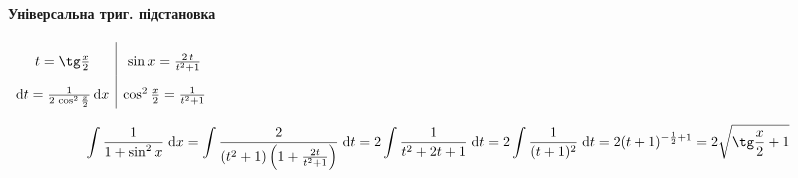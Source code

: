 \documentclass[../rgr1.tex]{subfiles}
\begin{document}
\Solution

\paragraph{Універсальна триг. підстановка}
\begin{varwidth}{1in}
	\fbox
{
	$\def\arraystretch{2}\begin{array}{c|c}t=\tg\frac{x}{2}&\sin x=\frac{2\,t}{{t}^{2}+1}\\\mathrm{d}t=\frac{1}{2\,\cos^{2}\frac{x}{2}}\,\mathrm{d}x&\cos^{2}\frac{x}{2}=\frac{1}{{t}^{2}+1}\end{array}$
}
\end{varwidth}

\begin{dmath}
	\int{\frac{1}{1+\sin^{2}x}}{\;\mathrm{d}x}
	=\int{\frac{2}{(t^2+1)\left(1+\frac{2t}{t^2+1}\right)}}{\;\mathrm{d}t}
	=2\int{\frac{1}{t^2+2t+1}}{\;\mathrm{d}t}
	=2\int{\frac{1}{(t+1)^2}}{\;\mathrm{d}t}
	=2(t+1)^{-\frac{1}{2}+1}
	=2\sqrt{\tg\frac{x}{2}+1}
\end{dmath}

\end{document}

